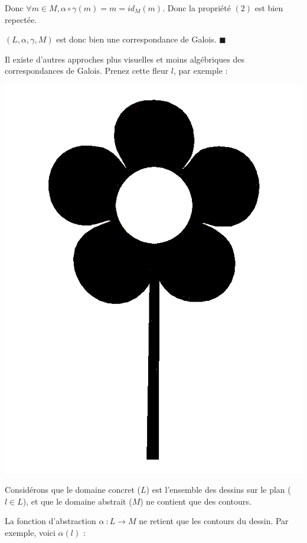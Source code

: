 \documentclass[french]{article}
\begin{document}
  Donc $\forall m \in M, \alpha \circ \gamma (m) = m = id_M(m)$. Donc la propriété $(2)$ est bien repectée.
  
  $(L, \alpha, \gamma, M)$ est donc bien une correspondance de Galois. \hfill $\blacksquare$
  
  \bigbreak
  
  Il existe d'autres approches plus visuelles et moins algébriques des correspondances de Galois. Prenez cette fleur $l$, par exemple :
  
  \begin{center}
    \includegraphics[scale=0.19]{./pictures/flower2.png}
  \end{center}
  
  Considérons que le domaine concret ($L$) est l'ensemble des dessins sur le plan ($l \in L$), et que le domaine abstrait ($M$) ne contient que des contours.
  
  La fonction d'abstraction $\alpha\ : L \rightarrow M$ ne retient que les contours du dessin. Par exemple, voici $\alpha (l)$ :
  
\end{document}
